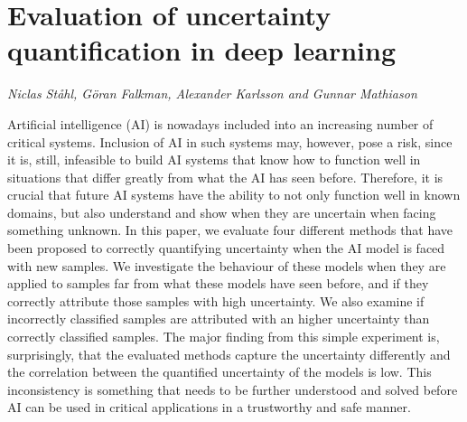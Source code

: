 \documentclass[../booklet.tex]{subfiles}
\begin{document}
\section[Evaluation of uncertainty quantification in deep learning. {\it Niclas Ståhl, Göran Falkman, Alexander Karlsson and Gunnar Mathiason}]{Evaluation of uncertainty quantification in deep learning}
   

\begin{center}
  {\it Niclas Ståhl, Göran Falkman, Alexander Karlsson and Gunnar Mathiason}
\end{center}

\vskip 0.8cm


  Artificial intelligence (AI) is nowadays included into an increasing number of critical systems.
  Inclusion of AI in such systems may, however, pose a risk, since it is, still, infeasible to build AI systems that know how to function well in situations that differ greatly from what the AI has seen before.
  Therefore, it is crucial that future AI systems have the ability to not only function well in known domains, but also understand and show when they are uncertain when facing something unknown.
  In this paper, we evaluate four different methods that have been proposed to correctly quantifying uncertainty when the AI model is faced with new samples.
  We investigate the behaviour of these models when they are applied to samples far from what these models have seen before, and if they correctly attribute those samples with high uncertainty.
  We also examine if incorrectly classified samples are attributed with an higher uncertainty than correctly classified samples.
  The major finding from this simple experiment is, surprisingly, that the evaluated methods capture the uncertainty differently and the correlation between the quantified uncertainty of the models is low.
  This inconsistency is something that needs to be further understood and solved before AI can be used in critical applications in a trustworthy and safe manner.
\end{document}
